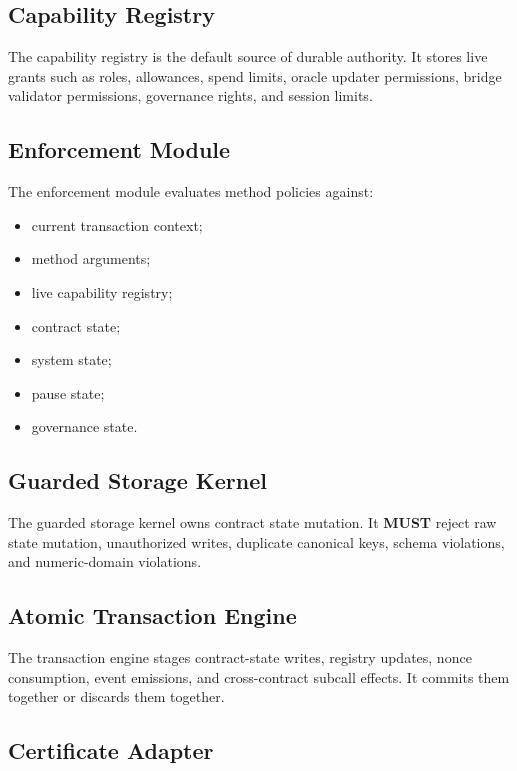 \documentclass[11pt]{article}
\newcommand{\MUST}{\textbf{MUST}}
\begin{document}
\subsection{Capability Registry}

The capability registry is the default source of durable authority. It stores live grants such as roles, allowances, spend limits, oracle updater permissions, bridge validator permissions, governance rights, and session limits.

\subsection{Enforcement Module}

The enforcement module evaluates method policies against:

\begin{itemize}
  \item current transaction context;
  \item method arguments;
  \item live capability registry;
  \item contract state;
  \item system state;
  \item pause state;
  \item governance state.
\end{itemize}

\subsection{Guarded Storage Kernel}

The guarded storage kernel owns contract state mutation. It \MUST{} reject raw state mutation, unauthorized writes, duplicate canonical keys, schema violations, and numeric-domain violations.

\subsection{Atomic Transaction Engine}

The transaction engine stages contract-state writes, registry updates, nonce consumption, event emissions, and cross-contract subcall effects. It commits them together or discards them together.

\subsection{Certificate Adapter}
\end{document}
